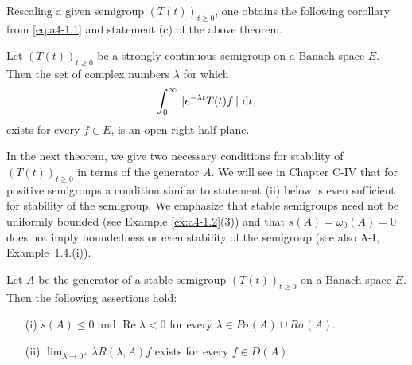 
Rescaling a given semigroup $ (T(t))_{t \geq 0} $, one obtains the following corollary from \eqref{eq:a4-1.1} and statement (c) of the above theorem.

\begin{corollary} \label{cor:a4-1.12} 
Let $ (T(t))_{t \geq 0} $ be a strongly continuous semigroup on a Banach space $ E $. Then the set of complex numbers $ \lambda $ for which
\[
\int_{0}^{\infty} \|e^{-\lambda t} T (t) f \| \,\mathop{}\!\mathrm{d}{t},
\]
exists for every $ f \in E $, is an open right half-plane.
\end{corollary}


In the next theorem, we give two necessary conditions for stability of $ (T(t))_{t \geq 0} $ in terms of the generator $ A $. We will see in Chapter C-IV that for positive semigroups a condition similar to statement (ii) below is even sufficient for stability of the semigroup. We emphasize that stable semigroups need not be uniformly bounded (see Example \ref{ex:a4-1.2}(3)) and that $ s(A) = \omega_0(A) = 0 $ does not imply boundedness or even stability of the semigroup (see also A-I, Example~1.4.(i)).

\begin{theorem} \label{thm:a4-1.13} Let $ A $ be the generator of a stable semigroup $ (T(t))_{t \geq 0} $ on a Banach space $ E $. Then the following assertions hold:

\begin{itemize}
    \item[(i)] $ s(A) \leq 0 $ and $ \operatorname{Re} \lambda < 0 $ for every $ \lambda \in P\sigma (A) \cup R\sigma(A) $.
    \item[(ii)] $ \lim_{\lambda \to 0^+} \lambda R(\lambda, A) f $ exists for every $ f \in D(A) $.
\end{itemize}
\end{theorem}

